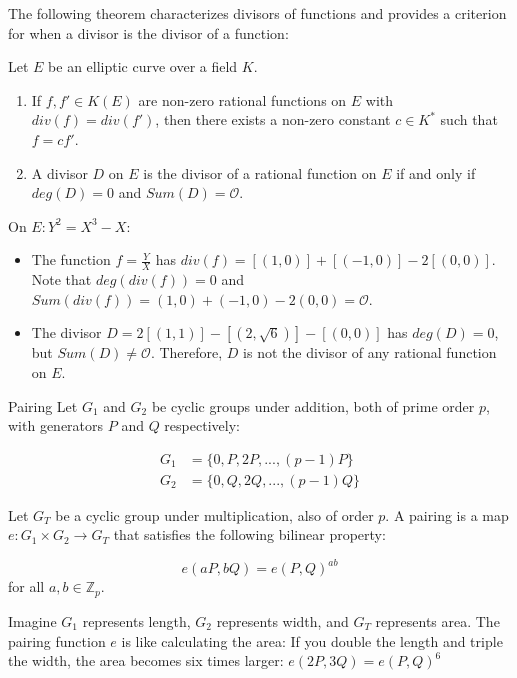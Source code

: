 \documentclass{article}
\begin{document}
The following theorem characterizes divisors of functions and provides a criterion for when a divisor is the divisor of a function:

\begin{theorem}{}{}
Let $E$ be an elliptic curve over a field $K$.
\begin{enumerate}
    \item If $f, f' \in K(E)$ are non-zero rational functions on $E$ with $div(f) = div(f')$, then there exists a non-zero constant $c \in K^*$ such that $f = cf'$.
    \item A divisor $D$ on $E$ is the divisor of a rational function on $E$ if and only if $deg(D) = 0$ and $Sum(D) = \mathcal{O}$.
\end{enumerate}
\end{theorem}

On $E: Y^2 = X^3 - X$:
\begin{itemize}
    \item The function $f = \frac{Y}{X}$ has $div(f) = [(1,0)] + [(-1,0)] - 2[(0,0)]$. Note that $deg(div(f)) = 0$ and $Sum(div(f)) = (1,0) + (-1,0) - 2(0,0) = \mathcal{O}$.
    \item The divisor $D = 2[(1,1)] - [(2,\sqrt{6})] - [(0,0)]$ has $deg(D) = 0$, but $Sum(D) \neq \mathcal{O}$. Therefore, $D$ is not the divisor of any rational function on $E$.
\end{itemize}

\begin{definition}{Pairing}{}
Let $G_1$ and $G_2$ be cyclic groups under addition, both of prime order $p$, with generators $P$ and $Q$ respectively:

    \begin{align}
        G_1 &= \{0, P, 2P, ..., (p-1)P\} \\
        G_2 &= \{0, Q, 2Q, ..., (p-1)Q\}
    \end{align}

Let $G_T$ be a cyclic group under multiplication, also of order $p$.
A pairing is a map $e: G_1 \times G_2 \rightarrow G_T$ that satisfies the following bilinear property:

    \begin{equation}
        e(aP, bQ) = e(P, Q)^{ab}
    \end{equation} for all $a, b \in \mathbb{Z}_p$.
\end{definition}

Imagine $G_1$ represents length, $G_2$ represents width, and $G_T$ represents area. The pairing function $e$ is like calculating the area: If you double the length and triple the width, the area becomes six times larger: $e(2P, 3Q) = e(P, Q)^{6}$
\end{document}
